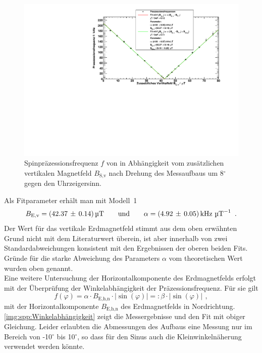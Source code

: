 \begin{figure}[H]
\begin{center}
  \includegraphics[width=\textwidth]{../img/part4/Rb85_gedreht.pdf}
  \caption{Spinpräzessionsfrequenz $f$ von  in Abhängigkeit
  vom zusätzlichen vertikalen Magnetfeld $B_\text{S,v}$
  nach Drehung des Messaufbaus um 8$^\circ$ gegen den Uhrzeigersinn.}
  \label{img:spp:SPPRb87gedr}
\end{center}
\end{figure} 

Als Fitparameter erhält man mit Modell~1
\begin{equation}
  B_\text{E,v} = (42.37\,\pm\,0.14)\,\text{\textmu T} \qquad \text{und} \qquad \alpha = (4.92\,\pm\,0.05)\,\text{kHz } \text{\textmu T}^{-1} \ \, .
\end{equation}
Der Wert für das vertikale Erdmagnetfeld stimmt aus dem oben erwähnten Grund nicht mit dem Literaturwert überein,
ist aber innerhalb von zwei Standardabweichungen konsistent mit den Ergebnissen der oberen beiden Fits.
Gründe für die starke Abweichung des Parameters $\alpha$ vom theoretischen Wert wurden oben genannt.\\

Eine weitere Untersuchung der Horizontalkomponente des Erdmagnetfelds erfolgt
mit der Überprüfung der Winkelabhängigkeit der Präzessionsfrequenz.
Für sie gilt
\begin{equation}
  f(\varphi) = \alpha \cdot B_\text{E,h,n} \cdot |\sin(\varphi)| =:\beta \cdot |\sin(\varphi)|\ \, ,
\end{equation}
mit der Horizontalkomponente $B_\text{E,h,n}$ des Erdmagnetfelds in Nordrichtung.
\autoref{img:spp:Winkelabhängigkeit} zeigt die Messergebnisse und den Fit mit obiger Gleichung.
Leider erlaubten die Abmessungen des Aufbaus eine Messung nur im Bereich von -10$^\circ$ bis 10$^\circ$,
so dass für den Sinus auch die Kleinwinkelnäherung verwendet werden könnte.

